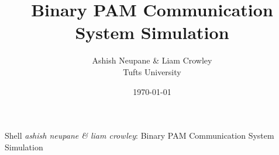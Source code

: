\documentclass[11pt, journal, twocolumn]{IEEEtran}
\begin{document}
\title{Binary PAM Communication System Simulation}
\author{Ashish Neupane \& Liam Crowley \\ Tufts University}
\date{\today}
{Shell \MakeLowercase{\textit{Ashish Neupane \& Liam Crowley}}: Binary PAM Communication System Simulation}
\begin{spacing}{1}
\maketitle
\end{spacing}\vspace{-2em}

%
%
\newpage

\end{document}
